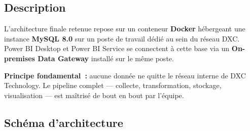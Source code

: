 \documentclass[12pt, a4paper]{article}
\begin{document}
\subsection{Description}

L'architecture finale retenue repose sur un conteneur \textbf{Docker} hébergeant
une instance \textbf{MySQL 8.0} sur un poste de travail dédié au sein du réseau
DXC. Power BI Desktop et Power BI Service se connectent à cette base via un
\textbf{On-premises Data Gateway} installé sur le même poste.

\vspace{0.3cm}

\begin{purplebox}
\textbf{Principe fondamental~:} aucune donnée ne quitte le réseau interne de
DXC Technology. Le pipeline complet — collecte, transformation, stockage,
visualisation — est maîtrisé de bout en bout par l'équipe.
\end{purplebox}

\vspace{0.4cm}

\subsection{Schéma d'architecture}
\end{document}
